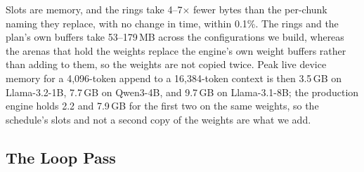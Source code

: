 Slots are memory, and the rings take 4--7$\times$ fewer bytes than the per-chunk naming they replace, with no change in time, within 0.1\%.
The rings and the plan's own buffers take 53--179\,MB across the configurations we build, whereas the arenas that hold the weights replace the engine's own weight buffers rather than adding to them, so the weights are not copied twice.
Peak live device memory for a 4{,}096-token append to a 16{,}384-token context is then 3.5\,GB on Llama-3.2-1B, 7.7\,GB on Qwen3-4B, and 9.7\,GB on Llama-3.1-8B; the production engine holds 2.2 and 7.9\,GB for the first two on the same weights, so the schedule's slots and not a second copy of the weights are what we add.

\subsection{The Loop Pass}
\label{app:loop-pass}

